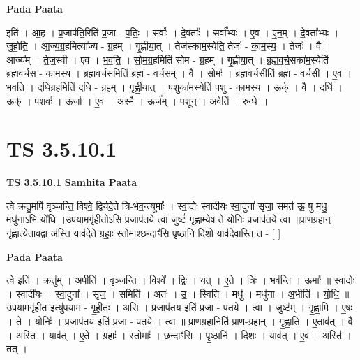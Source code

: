 \documentclass[17pt]{extarticle}
\begin{document}
\textbf{Pada Paata} \newline

इति॑ । आ॒ह॒ । प्र॒जाप॑ति॒रिति॑ प्र॒जा - प॒तिः॒ । सर्वाः᳚ । दे॒वताः᳚ । सर्वा᳚भ्यः । ए॒व । ए॒न॒म् । दे॒वता᳚भ्यः । जु॒हो॒ति॒ । आ॒ज्य॒ग्र॒हमित्या᳚ज्य - ग्र॒हम् । गृ॒ह्णी॒या॒त् । तेज॑स्काम॒स्येति॒ तेजः॑ - का॒म॒स्य॒ । तेजः॑ । वै । आज्य᳚म् । ते॒ज॒स्वी । ए॒व । भ॒व॒ति॒ । सो॒म॒ग्र॒हमिति॑ सोम - ग्र॒हम् । गृ॒ह्णी॒या॒त् । ब्र॒ह्म॒व॒र्च॒सका॑म॒स्येति॑ ब्रह्मवर्च॒स - का॒म॒स्य॒ । ब्र॒ह्म॒व॒र्च॒समिति॑ ब्रह्म - व॒र्च॒सम् । वै । सोमः॑ । ब्र॒ह्म॒व॒र्च॒सीति॑ ब्रह्म - व॒र्च॒सी । ए॒व । भ॒व॒ति॒ । द॒धि॒ग्र॒हमिति॑ दधि - ग्र॒हम् । गृ॒ह्णी॒या॒त् । प॒शुका॑म॒स्येति॑ प॒शु - का॒म॒स्य॒ । ऊर्क् । वै । दधि॑ । ऊर्क् । प॒शवः॑ । ऊ॒र्जा । ए॒व । अ॒स्मै॒ । ऊर्ज᳚म् । प॒शून् । अवेति॑ । रु॒न्धे॒ ॥  \newline





\section{ TS 3.5.10.1 }

\textbf{TS 3.5.10.1 } \newline
\textbf{Samhita Paata} \newline

त्वे क्रतु॒मपि॑ वृञ्जन्ति॒ विश्वे॒ द्विर्यदे॒ते त्रि-र्भव॒न्त्यूमाः᳚ । स्वा॒दोः स्वादी॑यः स्वा॒दुना॑ सृजा॒ समत॑ ऊ॒ षु मधु॒ मधु॑ना॒ऽभि यो॑धि ।उ॒प॒या॒मगृ॑हीतोऽसि प्र॒जाप॑तये त्वा॒ जुष्टं॑ गृह्णाम्ये॒ष ते॒ योनिः॑ प्र॒जाप॑तये त्वा ॥प्रा॒ण॒ग्र॒हान् गृ॑ह्णात्ये॒ताव॒द्वा अ॑स्ति॒ याव॑दे॒ते ग्रहाः॒ स्तोमा॒श्छन्दाꣳ॑सि पृ॒ष्ठानि॒ दिशो॒ याव॑दे॒वास्ति॒ त - [  ] \newline

\textbf{Pada Paata} \newline

त्वे इति॑ । क्रतु᳚म् । अपीति॑ । वृ॒ञ्ज॒न्ति॒ । विश्वे᳚ । द्विः । यत् । ए॒ते । त्रिः । भव॑न्ति । ऊमाः᳚ ॥ स्वा॒दोः । स्वादी॑यः । स्वा॒दुना᳚ । सृ॒ज॒ । समिति॑ । अतः॑ । उ॒ । स्विति॑ । मधु॑ । मधु॑ना । अ॒भीति॑ । यो॒धि॒ ॥ उ॒प॒या॒मगृ॑हीत॒ इत्यु॑पया॒म - गृ॒ही॒तः॒ । अ॒सि॒ । प्र॒जाप॑तय॒ इति॑ प्र॒जा - प॒त॒ये॒ । त्वा॒ । जुष्ट᳚म् । गृ॒ह्णा॒मि॒ । ए॒षः । ते॒ । योनिः॑ । प्र॒जाप॑तय॒ इति॑ प्र॒जा - प॒त॒ये॒ । त्वा॒ ॥ प्रा॒ण॒ग्र॒हानिति॑ प्राण-ग्र॒हान् । गृ॒ह्णा॒ति॒ । ए॒ताव॑त् । वै । अ॒स्ति॒ । याव॑त् । ए॒ते । ग्रहाः᳚ । स्तोमाः᳚ । छन्दाꣳ॑सि । पृ॒ष्ठानि॑ । दिशः॑ । याव॑त् । ए॒व । अस्ति॑ । तत् ।  \newline
\end{document}
